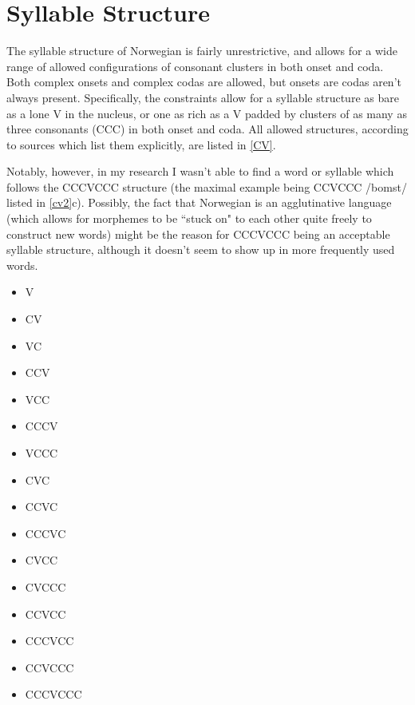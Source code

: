 \documentclass{article}
\begin{document}
\section{Syllable Structure}

The syllable structure of Norwegian is fairly unrestrictive, and allows for a wide range of allowed configurations of consonant clusters in both onset and coda. Both complex onsets and complex codas are allowed, but onsets are codas aren't always present. Specifically, the constraints allow for a syllable structure as bare as a lone V in the nucleus, or one as rich as a V padded by clusters of as many as three consonants (CCC) in both onset and coda. All allowed structures, according to sources which list them explicitly, are listed in \ref{CV}. \cite{TheGermanicLanguages}

Notably, however, in my research I wasn't able to find a word or syllable which follows the CCCVCCC structure (the maximal example being CCVCCC /b\textrtaill omst/ listed in \ref{cv2}c). Possibly, the fact that Norwegian is an agglutinative language (which allows for morphemes to be ``stuck on" to each other quite freely to construct new words) might be the reason for CCCVCCC being an acceptable syllable structure, although it doesn't seem to show up in more frequently used words.

\begin{exe}
    \ex
    \label{CV}
    \begin{multicols}{3}
    
    \begin{itemize}
        \item [] V
        \item [] CV
        \item [] VC
        \item [] CCV
        \item [] VCC
        \item [] CCCV
        \item [] VCCC
        \item [] CVC
        \item [] CCVC
        \item [] CCCVC
        \item [] CVCC
        \item [] CVCCC
        \item [] CCVCC
        \item [] CCCVCC
        \item [] CCVCCC
        \item [] CCCVCCC
    \end{itemize}
    
    \end{multicols}
\end{exe}
\end{document}
